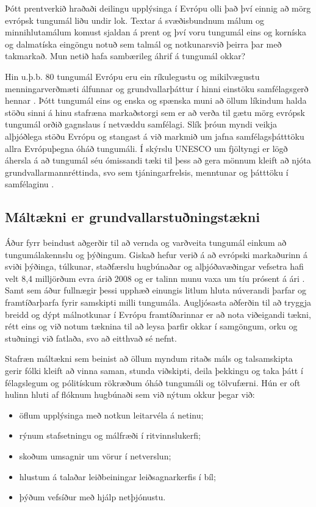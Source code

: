 \begin{multicols}{2}
Þótt prentverkið hraðaði deilingu upplýsinga í Evrópu olli það því einnig að mörg evrópsk tungumál liðu undir lok. Textar á svæðisbundnum málum og minnihlutamálum komust sjaldan á prent og því voru tungumál eins og korníska og dalmatíska eingöngu notuð sem talmál og notkunarsvið þeirra þar með takmarkað. Mun netið hafa sambærileg áhrif á tungumál okkar? 

Hin u.þ.b. 80 tungumál Evrópu eru ein ríkulegustu og mikilvægustu menningarverðmæti álfunnar og grundvallarþáttur í hinni einstöku samfélagsgerð hennar \cite{EC2}. Þótt tungumál eins og enska og spænska muni að öllum líkindum halda stöðu sinni á hinu stafræna markaðstorgi sem er að verða til gætu mörg evrópsk tungumál orðið gagnslaus í netvæddu samfélagi. Slík þróun myndi veikja alþjóðlega stöðu Evrópu og stangast á við markmið um jafna samfélagsþátttöku allra Evrópuþegna óháð tungumáli.
Í skýrslu UNESCO um fjöltyngi er lögð áhersla á að tungumál séu ómissandi tæki til þess að gera mönnum kleift að njóta grundvallarmannréttinda, svo sem tjáningarfrelsis, menntunar og þátttöku í samfélaginu \cite{Unesco1}.

\subsection{Máltækni er grund\-vallar\-stuðningstækni}

Áður fyrr beindust aðgerðir til að vernda og varðveita tungumál einkum að tungumálakennslu og þýðingum. Giskað hefur verið á að evrópski markaðurinn á sviði þýðinga, túlkunar, staðfærslu hugbúnaðar og alþjóðavæðingar vefsetra hafi velt 8,4 milljörðum evra árið 2008 og er talinn munu vaxa um tíu prósent á ári \cite{EC3}. Samt sem áður fullnægir þessi upphæð einungis litlum hluta núverandi þarfar og framtíðarþarfa fyrir samskipti milli tungumála. Augljósasta aðferðin til að tryggja breidd og dýpt málnotkunar í Evrópu framtíðarinnar er að nota viðeigandi tækni, rétt eins og við notum tæknina til að leysa þarfir okkar í samgöngum, orku og stuðningi við fatlaða, svo að eitthvað sé nefnt. 

Stafræn máltækni sem beinist að öllum myndum ritaðs máls og talsamskipta gerir fólki kleift að vinna saman, stunda viðskipti, deila þekkingu og taka þátt í félagslegum og pólitískum rökræðum óháð tungumáli og tölvufærni. Hún er oft hulinn hluti af flóknum hugbúnaði sem við nýtum okkur þegar við:

\begin{itemize}
\item öflum upplýsinga með notkun leitarvéla á netinu;
\item rýnum stafsetningu og málfræði í ritvinnslukerfi;
\item skoðum umsagnir um vörur í netverslun;
\item hlustum á talaðar leiðbeiningar leiðsagnarkerfis í bíl;
\item þýðum vefsíður með hjálp netþjónustu.
\end{itemize}


\end{multicols}
